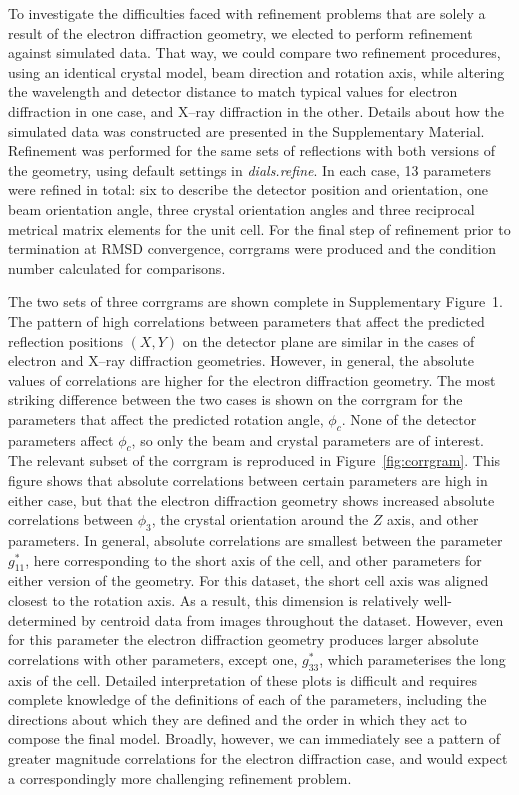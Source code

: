 \documentclass[preprint]{iucr}
\newcommand{\dialsrefine}{\emph{dials.refine}\xspace}
\begin{document}
To investigate the difficulties faced with refinement problems that are solely
a result of the electron diffraction geometry, we elected to perform refinement
against simulated data. That way, we could compare two refinement procedures,
using an identical crystal model, beam direction and rotation axis, while
altering the wavelength and detector distance to match typical values for
electron diffraction in one case, and X--ray diffraction in the other.
Details about how the simulated data was constructed are presented in
the Supplementary Material. Refinement
was performed for the same sets of reflections with both versions
of the geometry, using default settings in
\dialsrefine. In each case, 13 parameters were refined in total: six to
describe the detector position and orientation, one beam orientation angle,
three crystal orientation angles and three reciprocal metrical matrix elements
for the unit cell. For the final step of refinement prior to termination at
RMSD convergence, corrgrams were produced and the condition number calculated
for comparisons.

The two sets of three corrgrams are shown complete in Supplementary Figure~1.
The pattern of high correlations between parameters
that affect the predicted reflection positions $(X, Y)$ on the detector plane
are similar in the cases of electron and X--ray diffraction geometries. However,
in general, the absolute values of correlations are higher for the electron
diffraction geometry. The most striking difference between the two cases is
shown on the corrgram for the parameters that affect the predicted rotation
angle, $\phi_c$. None of the detector parameters affect $\phi_c$, so only the
beam and crystal parameters are of interest. The relevant subset of the
corrgram is reproduced in Figure~\ref{fig:corrgram}. This figure shows that
absolute correlations between certain parameters are high in either case, but
that the electron diffraction geometry shows increased absolute correlations
between $\phi_3$, the crystal orientation around the $Z$ axis, and other
parameters. In general, absolute correlations are smallest between the
parameter $g^*_{11}$, here corresponding to the short axis of the cell, and
other parameters for either version of the geometry. For this dataset, the
short cell axis was aligned closest to the rotation axis. As a result, this
dimension is relatively well-determined by centroid data from images throughout
the dataset. However, even for this parameter the electron diffraction geometry
produces larger absolute correlations with other parameters, except one,
$g^*_{33}$, which parameterises the long axis of the cell. Detailed
interpretation of these plots is difficult and requires complete knowledge of
the definitions of each of the parameters, including the directions about which
they are defined and the order in which they act to compose the final model.
Broadly, however, we can immediately see a pattern of greater magnitude
correlations for the electron diffraction case, and would expect a
correspondingly more challenging refinement problem.
\end{document}
